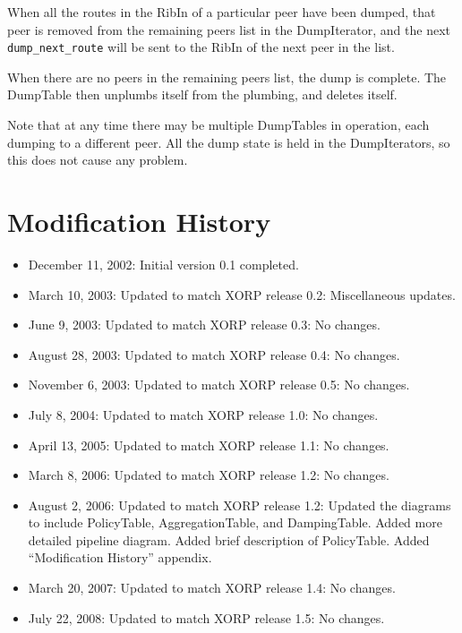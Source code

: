 \documentclass[11pt]{article}
\begin{document}
When all the routes in the RibIn of a particular peer have been
dumped, that peer is removed from the remaining peers list in the
DumpIterator, and the next {\tt dump\_next\_route} will be sent to the RibIn
of the next peer in the list.

When there are no peers in the remaining peers list, the dump is
complete.  The DumpTable then unplumbs itself from the plumbing, and
deletes itself.

Note that at any time there may be multiple DumpTables in operation,
each dumping to a different peer.  All the dump state is held in the
DumpIterators, so this does not cause any problem.

\appendix
\section{Modification History}

\begin{itemize}

  \item December 11, 2002: Initial version 0.1 completed.

  \item March 10, 2003: Updated to match XORP release 0.2:
   Miscellaneous updates.

  \item June 9, 2003: Updated to match XORP release 0.3:
   No changes.

  \item August 28, 2003: Updated to match XORP release 0.4:
   No changes.

  \item November 6, 2003: Updated to match XORP release 0.5:
   No changes.

  \item July 8, 2004: Updated to match XORP release 1.0:
   No changes.

  \item April 13, 2005: Updated to match XORP release 1.1:
   No changes.

  \item March 8, 2006: Updated to match XORP release 1.2:
   No changes.

  \item August 2, 2006: Updated to match XORP release 1.2:
   Updated the diagrams to include PolicyTable, AggregationTable,
   and DampingTable. Added more detailed pipeline diagram. Added brief
   description of PolicyTable. Added ``Modification History'' appendix.

  \item March 20, 2007: Updated to match XORP release 1.4:
   No changes.

  \item July 22, 2008: Updated to match XORP release 1.5:
   No changes.

\end{itemize}





\end{document}
